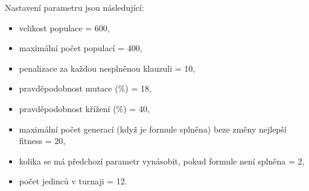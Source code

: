 \documentclass[a4paper]{article}
\begin{document}
	Nastavení parametru jsou následující:
	\begin{itemize}
			\item velikost populace = 600,
			\item maximální počet populací = 400,
			\item penalizace za každou nesplněnou klauzuli = 10,
			\item pravděpodobnost mutace (\%) = 18,
			\item pravděpodobnost křížení (\%) = 40,
			\item maximální počet generací (když je formule splněna) beze změny nejlepší fitness = 20,
			\item kolika se má předchozí parametr vynásobit, pokud formule není splněna = 2,
			\item počet jedinců v turnaji = 12.
	\end{itemize}
\end{document}
